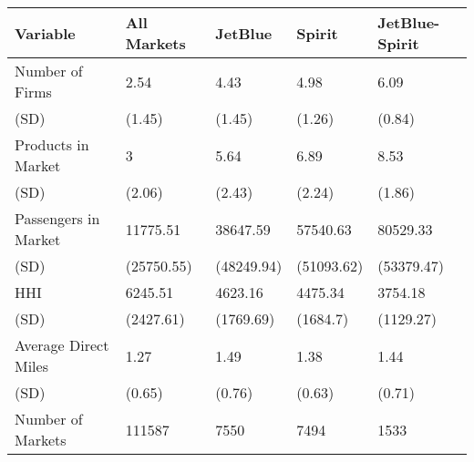 
\begin{tabular}[t]{lllll}
\toprule
Variable & All Markets & JetBlue & Spirit & JetBlue-Spirit\\
\midrule
Number of Firms & 2.54 & 4.43 & 4.98 & 6.09\\
(SD) & (1.45) & (1.45) & (1.26) & (0.84)\\
Products in Market & 3 & 5.64 & 6.89 & 8.53\\
(SD) & (2.06) & (2.43) & (2.24) & (1.86)\\
Passengers in Market & 11775.51 & 38647.59 & 57540.63 & 80529.33\\
(SD) & (25750.55) & (48249.94) & (51093.62) & (53379.47)\\
HHI & 6245.51 & 4623.16 & 4475.34 & 3754.18\\
(SD) & (2427.61) & (1769.69) & (1684.7) & (1129.27)\\
Average Direct Miles & 1.27 & 1.49 & 1.38 & 1.44\\
(SD) & (0.65) & (0.76) & (0.63) & (0.71)\\
\midrule
Number of Markets & 111587 & 7550 & 7494 & 1533\\
\bottomrule
\end{tabular}
